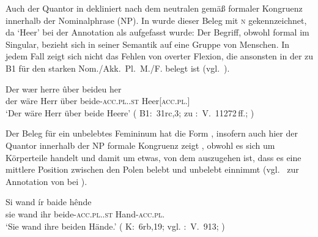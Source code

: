 \begin{exe}
\end{exe}

Auch der Quantor in  dekliniert nach dem neutralen
 gemäß formaler Kongruenz innerhalb der
Nominalphrase (NP). In  wurde dieser
Beleg mit \textsc{n\subA} gekennzeichnet, da  `Heer' bei der
Annotation als  \autocite[211--213]{corbett2006} aufgefasst
wurde: Der Begriff, obwohl formal im Singular, bezieht sich in seiner Semantik
auf eine Gruppe von Menschen. In jedem Fall zeigt sich nicht das Fehlen von
overter Flexion, die ansonsten in der  zu B1 für den starken
Nom./Akk.~Pl.~M./F. belegt ist (vgl.~).

\begin{exe}
\ex \label{ex:beideuher}
	\gll Der wær herre ûber beideu her \\
		der wäre Herr über beide-\textsc{acc.pl.\NeutA.st} Heer[\textsc{acc.pl.\NeutA}] \\
	\trans `Der wäre Herr über beide Heere'
		(%
			B1:~31rc,3; zu
			\KC:~V.~11272\,ff.;
			\cite[287]{schroeder1895}%
		)
\end{exe}

Der Beleg für ein unbelebtes Femininum hat die Form ,
insofern auch hier der Quantor innerhalb der NP formale
Kongruenz zeigt , obwohl es sich um
Körperteile handelt und damit um etwas, von dem auszugehen ist,
dass es eine mittlere Position zwischen den Polen belebt und
unbelebt einnimmt (vgl.~ zur Annotation von
 bei ).

\begin{exe}
	\ex \gll Si wand ír baide hênde \\
			sie wand ihr beide-\textsc{acc.pl.\FemI.st} Hand-\textsc{acc.pl.\FemI} \\
		\trans `Sie wand ihre beiden Hände.'
			(%
				K:~6rb,19; vgl.
				\KC:~V.~913;
				\cite[98]{schroeder1895}%
			)
		\label{ex:uozehende_2}
\end{exe}

